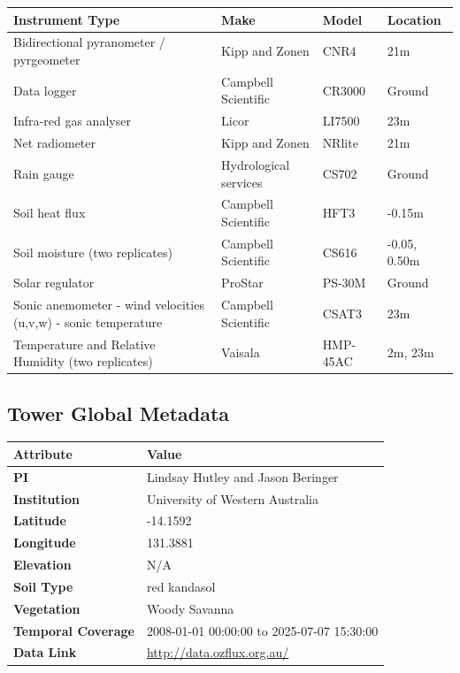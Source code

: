 \documentclass[11pt,a4paper]{article}
\begin{document}
\begin{longtable}{p{4.5cm}p{3.5cm}p{3.5cm}p{3.5cm}}
\toprule
\textbf{Instrument Type} & \textbf{Make} & \textbf{Model} & \textbf{Location} \\
\midrule
\endhead
\bottomrule
\endfoot
Bidirectional  pyranometer / pyrgeometer & Kipp and Zonen & CNR4 & 21m \\
Data  logger & Campbell Scientific & CR3000 & Ground \\
Infra-red  gas analyser & Licor & LI7500 & 23m \\
Net  radiometer & Kipp and Zonen & NRlite & 21m \\
Rain gauge & Hydrological services & CS702 & Ground \\
Soil  heat flux & Campbell Scientific & HFT3 & -0.15m \\
Soil  moisture (two replicates) & Campbell Scientific & CS616 & -0.05,  0.50m \\
Solar  regulator & ProStar & PS-30M & Ground \\
Sonic anemometer       - wind velocities (u,v,w)        - sonic temperature & Campbell Scientific & CSAT3 & 23m \\
Temperature  and Relative Humidity  (two replicates) & Vaisala & HMP-45AC & 2m, 23m \\
\end{longtable}


\subsection*{Tower Global Metadata}

\begin{longtable}{p{4.5cm}p{10.5cm}}
\toprule
\textbf{Attribute} & \textbf{Value} \\
\midrule
\endhead
\bottomrule
\endfoot
\textbf{PI} & Lindsay Hutley and Jason Beringer \\
\textbf{Institution} & University of Western Australia \\
\textbf{Latitude} & -14.1592 \\
\textbf{Longitude} & 131.3881 \\
\textbf{Elevation} & N/A \\
\textbf{Soil Type} & red kandasol \\
\textbf{Vegetation} & Woody Savanna \\
\textbf{Temporal Coverage} & 2008-01-01 00:00:00 to 2025-07-07 15:30:00 \\
\textbf{Data Link} & \url{http://data.ozflux.org.au/} \\
\end{longtable}
\end{document}
